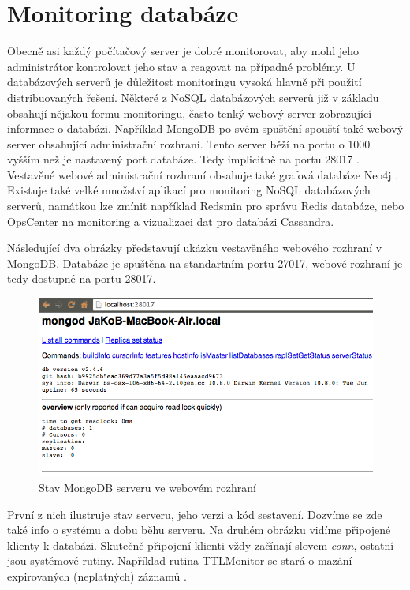 \section{Monitoring databáze}
Obecně asi každý počítačový server je dobré monitorovat, aby mohl jeho administrátor kontrolovat jeho stav a reagovat na případné problémy. U databázových serverů je důležitost monitoringu vysoká hlavně při použití distribuovaných řešení. Některé z NoSQL databázových serverů již v základu obsahují nějakou formu monitoringu, často tenký webový server zobrazující informace o databázi. Například MongoDB po svém spuštění spouští také webový server obsahující administrační rozhraní. Tento server běží na portu o 1000 vyšším než je nastavený port databáze. Tedy implicitně na portu 28017 \cite{mongoAdmin}. Vestavěné webové  administrační rozhraní obsahuje také grafová databáze Neo4j \cite{neo4jAdmin}. Existuje také velké množství aplikací pro monitoring NoSQL databázových serverů, namátkou lze zmínit například Redsmin pro správu Redis databáze, nebo OpsCenter na monitoring a vizualizaci dat pro databázi Cassandra.

Následující dva obrázky představují ukázku vestavěného webového rozhraní v MongoDB.
Databáze je spuštěna na standartním portu 27017, webové rozhraní je tedy dostupné na portu 28017.
 
\begin{figure}[h]
\begin{centering}
\includegraphics[scale=0.4]{obrazky/mongo-admin-top}
\par\end{centering}
\caption{Stav MongoDB serveru ve webovém rozhraní\label{fig:mongoAdmin}}
\end{figure}

\FloatBarrier
První z nich ilustruje stav serveru, jeho verzi a kód sestavení. Dozvíme se zde také info o systému a dobu běhu serveru. Na druhém obrázku vidíme připojené klienty k databázi. Skutečně připojení klienti vždy začínají slovem \emph{conn}, ostatní jsou systémové rutiny. Například rutina TTLMonitor se stará o mazání expirovaných (neplatných) záznamů \cite{mongoAdmin}.

